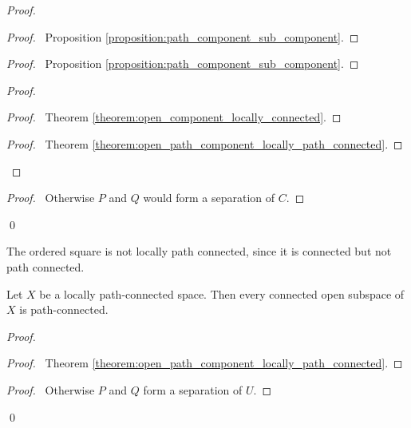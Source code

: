 \begin{proof}
    \pf
    \begin{proof}
        \pf\ Proposition \ref{proposition:path_component_sub_component}.
    \end{proof}
    \begin{proof}
        \pf\ Proposition \ref{proposition:path_component_sub_component}.
    \end{proof}
    \begin{proof}
        \begin{proof}
            \pf\ Theorem \ref{theorem:open_component_locally_connected}.
        \end{proof}
        \qedstep
        \begin{proof}
            \pf\ Theorem \ref{theorem:open_path_component_locally_path_connected}.
        \end{proof}
    \end{proof}
    \begin{proof}
        \pf\ Otherwise $P$ and $Q$ would form a separation of $C$.
    \end{proof}
    \qed
\end{proof}

\begin{example}
    The ordered square is not locally path connected, since it is connected but not path connected.
\end{example}

\begin{proposition}
    Let $X$ be a locally path-connected space. Then every connected open subspace
    of $X$ is path-connected.
\end{proposition}

\begin{proof}
    \pf
    \begin{proof}
        \pf\ Theorem \ref{theorem:open_path_component_locally_path_connected}.
    \end{proof}
    \begin{proof}
        \pf\ Otherwise $P$ and $Q$ form a separation of $U$.
    \end{proof}
    \qed
\end{proof}

